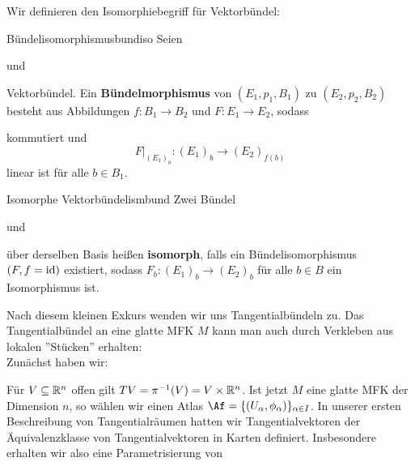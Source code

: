 Wir definieren den Isomorphiebegriff für Vektorbündel:
\begin{definition}{Bündelisomorphismus}{bundiso}
Seien 
und 
Vektorbündel. Ein \textbf{Bündelmorphismus} von $(E_1, p_1, B_1)$ zu $(E_2, p_2, B_2)$ besteht aus Abbildungen $f: B_1 \to B_2$ und $F: E_1 \to E_2$, sodass
\begin{center}
\end{center}
kommutiert und
\begin{equation}
F|_{(E_1)_b}: (E_1)_b \to (E_2)_{f(b)}
\end{equation}
linear ist für alle $b \in B_1$.
\end{definition}
\begin{definition}{Isomorphe Vektorbündel}{ismbund}
Zwei Bündel
und 
über derselben Basis heißen \textbf{isomorph}, falls ein Bündelisomorphismus $(F, f=\text{id})$ existiert, sodass $F_b: (E_1)_b \to (E_2)_b$ für alle $b \in B$ ein Isomorphismus ist.
\end{definition}
Nach diesem kleinen Exkurs wenden wir uns Tangentialbündeln zu. Das Tangentialbündel an eine glatte MFK $M$ kann man auch durch Verkleben aus lokalen ''Stücken'' erhalten:\\
Zunächst haben wir:
\begin{center}
\end{center}
Für $V \subseteq \mathbb{R}^n$ offen gilt $TV = \pi^{-1}(V) = V \times \mathbb{R}^n$. Ist jetzt $M$ eine glatte MFK der Dimension $n$, so wählen wir einen Atlas $\Af = \{(U_\alpha, \phi_\alpha)\}_{\alpha \in I}$. In unserer ersten Beschreibung von Tangentialräumen hatten wir Tangentialvektoren der Äquivalenzklasse von Tangentialvektoren in Karten definiert. Insbesondere erhalten wir also eine Parametrisierung von 
